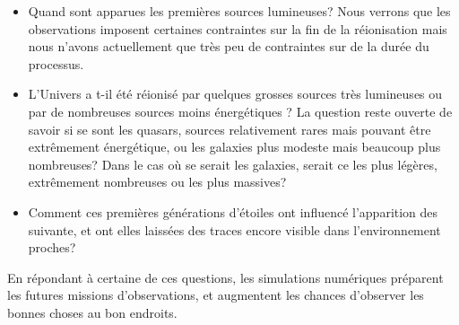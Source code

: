 \begin{itemize}
\item Quand sont apparues les premières sources lumineuses?
Nous verrons que les observations imposent certaines contraintes sur la fin de la réionisation mais nous n'avons actuellement que  très peu de contraintes sur de la durée du processus.

\item L'Univers a t-il été réionisé par quelques grosses sources très lumineuses ou par de nombreuses sources moins énergétiques ?
La question reste ouverte de savoir si se sont les quasars, sources relativement rares mais pouvant être extrêmement énergétique, ou les galaxies plus modeste mais beaucoup plus nombreuses?
Dans le cas où se serait les galaxies, serait ce les plus légères, extrêmement nombreuses ou les plus massives?

\item Comment ces premières générations d'étoiles ont influencé l'apparition des suivante, et ont elles laissées des traces encore visible dans l'environnement proches?

\end{itemize} 

En répondant à certaine de ces questions, les simulations numériques préparent les futures missions d'observations, et augmentent les chances d'observer les bonnes choses au bon endroits.



